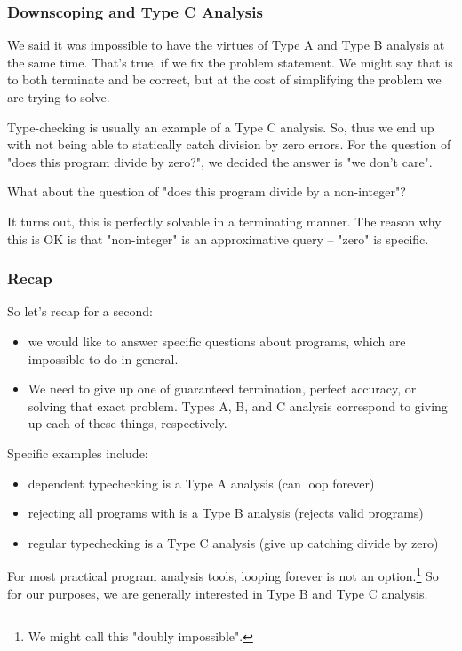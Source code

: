 \documentclass[aspectratio=169, handout]{beamer}
\begin{document}
\begin{frame}[fragile]
  \frametitle{Downscoping and Type C Analysis}

  We said it was impossible to have the virtues of Type A and Type B analysis at the
  same time. That's true, if we fix the problem statement. We might say that
   is to both terminate and be correct, but at the cost of
  simplifying the problem we are trying to solve.

  \pause
  \vspace{\fill}

  Type-checking is usually an example of a Type C analysis. So, thus we end up
  with not being able to statically catch division by zero errors. For the
  question of "does this program divide by zero?", we decided the answer is "we
  don't care".

  \pause
  \vspace{\fill}

  What about the question of "does this program divide by a non-integer"?

  \pause
  \vspace{\fill}

  It turns out, this is perfectly solvable in a terminating manner. The
  reason why this is OK is that "non-integer" is an approximative query --
  "zero" is specific.
\end{frame}

\begin{frame}[fragile]
  \frametitle{Recap}

  So let's recap for a second:
  \pause
  \begin{itemize}
    \item we would like to answer specific questions about programs, which are
    impossible to do in general. \pause
    \item We need to give up one of guaranteed termination, perfect accuracy,
    or solving that exact problem. Types A, B, and C analysis correspond to
    giving up each of these things, respectively.
  \end{itemize}

  \pause
  \vspace{\fill}

  Specific examples include:
  \begin{itemize}
    \item dependent typechecking is a Type A analysis (can loop forever) \pause
    \item rejecting all programs with  is a Type B analysis (rejects valid programs) \pause
    \item regular typechecking is a Type C analysis (give up catching divide by zero)
  \end{itemize}

  \pause
  \vspace{\fill}

  For most practical program analysis tools, looping forever is not an option.\footnote{We
  might call this "doubly impossible".} So for our purposes, we are generally
  interested in Type B and Type C analysis.
\end{frame}
\end{document}
